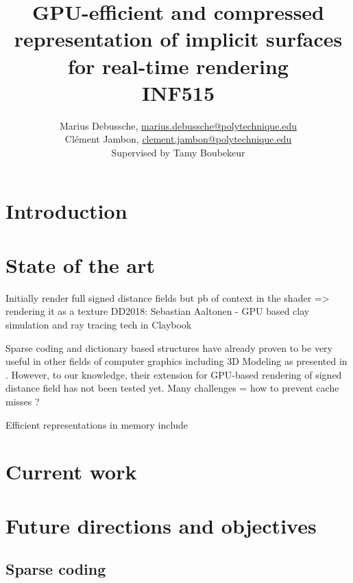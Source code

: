 \documentclass[10pt,a4paper,english, twocolumn]{article}
\title{\textbf{GPU-efficient and compressed representation of
implicit surfaces for real-time rendering} \\ INF515}
\author{Marius Debussche, \href{mailto:marius.debussche@polytechnique.edu}{marius.debussche@polytechnique.edu} \\ Clément Jambon, \href{mailto:clement.jambon@polytechnique.edu}{clement.jambon@polytechnique.edu} \\ Supervised by Tamy Boubekeur}
\begin{document}
\maketitle

\section{Introduction}

\section{State of the art}
Initially render full signed distance fields but pb of context in the shader => rendering it as a texture
DD2018: Sebastian Aaltonen - GPU based clay simulation and ray tracing tech in Claybook

Sparse coding and dictionary based structures have already proven to be very useful in other fields of computer graphics including 3D Modeling as presented in \cite{Lescoat:2018:3DDictSTAR}. However, to our knowledge, their extension for GPU-based rendering of signed distance field has not been tested yet. Many challenges = how to prevent cache misses ?

Efficient representations in memory include 

\section{Current work}
\section{Future directions and objectives}
\subsection{Sparse coding}



\end{document}
